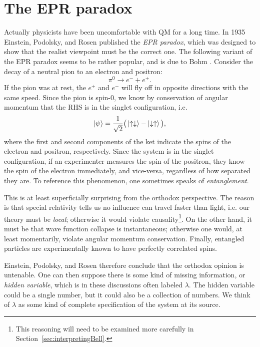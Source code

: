 \section{The EPR paradox}
Actually physicists have been uncomfortable with QM for a long time.
In 1935 Einstein, Podolsky, and Rosen
\cite{einstein_can_1935} published the {\it EPR paradox},
which was designed to show that the realist viewpoint must be
the correct one. The following variant of the EPR paradox seems to be
rather popular, and is due to Bohm \cite{bohm_quantum_1951}.
Consider the decay of a neutral pion to an electron and positron:
\begin{equation}
  \pi^0\to e^-+e^+.
\end{equation}
If the pion was at rest, the $e^+$ and $e^-$ will fly off in opposite
directions with the same speed. Since the pion is spin-0, we know
by conservation of angular momentum that the RHS is in the
singlet configuration, i.e.
\begin{equation}
  \ket{\psi}=\frac{1}{\sqrt{2}}\big(
   \ket{\uparrow\downarrow}-\ket{\downarrow\uparrow}\big),
\end{equation}
where the first and second components of the ket indicate the spins of
the electron and positron, respectively.
Since the system is in the singlet configuration, if an experimenter
measures the spin of the positron, they know the spin of the electron
immediately, and vice-versa, regardless of how separated they are.
To reference this phenomenon, one sometimes speaks of {\it entanglement}.

This is at least superficially surprising from the orthodox perspective.
The reason is that special relativity tells us no influence can travel
faster than light, i.e. our theory must be {\it local}; 
otherwise it would violate causality\footnote{This reasoning will need to
be examined more carefully in Section~\ref{sec:interpretingBell}.}. 
On the other
hand, it must be that wave function collapse is instantaneous; otherwise
one would, at least momentarily, violate angular momentum conservation.
Finally, entangled particles are experimentally known to have perfectly
correlated spins. 

Einstein, Podolsky, and Rosen therefore conclude
that the orthodox opinion is untenable. One can then suppose there is
some kind of missing information, or {\it hidden variable}, which
is in these discussions often labeled $\lambda$. The hidden variable
could be a single number, but it could also be a collection
of numbers. We think of $\lambda$ as some kind of complete specification of
the system at its source.

